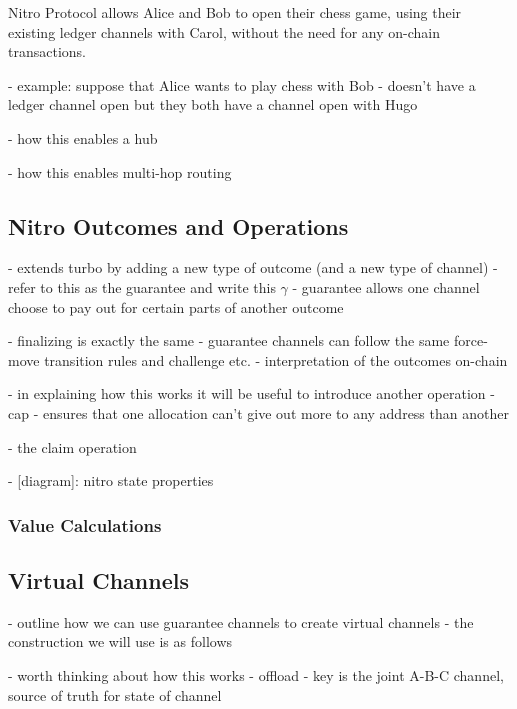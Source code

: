 \documentclass{article}
\theoremstyle{definition}
\begin{document}
Nitro Protocol allows Alice and Bob to open their chess game, using their existing ledger channels with Carol, without the need for any on-chain transactions.





- example: suppose that Alice wants to play chess with Bob
- doesn't have a ledger channel open but they both have a channel open with Hugo

- how this enables a hub

- how this enables multi-hop routing

\subsection{Nitro Outcomes and Operations}

- extends turbo by adding a new type of outcome (and a new type of channel)
- refer to this as the guarantee and write this $\gamma$
- guarantee allows one channel choose to pay out for certain parts of another outcome

- finalizing is exactly the same
- guarantee channels can follow the same force-move transition rules and challenge etc.
- interpretation of the outcomes on-chain

- in explaining how this works it will be useful to introduce another operation
- cap - ensures that one allocation can't give out more to any address than another



- the claim operation




- [diagram]: nitro state properties


\subsubsection{Value Calculations}

\subsection{Virtual Channels}

- outline how we can use guarantee channels to create virtual channels
- the construction we will use is as follows



- worth thinking about how this works
- offload
- key is the joint A-B-C channel, source of truth for state of channel
\end{document}
